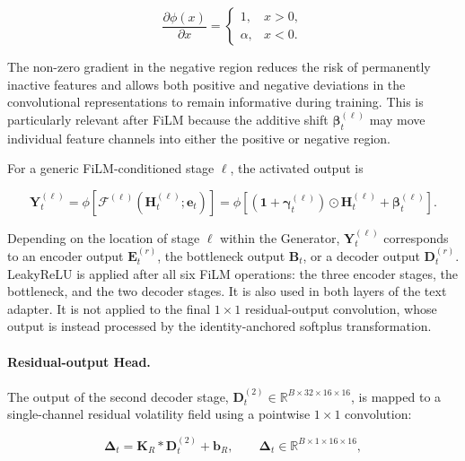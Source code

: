 \begin{equation}\label{eq:ch3:leaky_relu_derivative}
\frac{\partial\phi(x)}{\partial x}
=
\begin{cases}
1, & x>0,\\
\alpha, & x<0.
\end{cases}
\end{equation}

The non-zero gradient in the negative region reduces the risk of permanently
inactive features and allows both positive and negative deviations in the
convolutional representations to remain informative during training. This is
particularly relevant after FiLM because the additive shift
$\boldsymbol{\beta}^{(\ell)}_t$ may move individual feature channels into
either the positive or negative region.

For a generic FiLM-conditioned stage $\ell$, the activated output is

\begin{equation}\label{eq:ch3:film_leaky_relu_output}
\mathbf{Y}^{(\ell)}_t
=
\phi\left[
\mathcal{F}^{(\ell)}
\left(
\mathbf{H}^{(\ell)}_t;
\mathbf{e}_t
\right)
\right]
=
\phi\left[
\left(
\mathbf{1}
+
\boldsymbol{\gamma}^{(\ell)}_t
\right)
\odot
\mathbf{H}^{(\ell)}_t
+
\boldsymbol{\beta}^{(\ell)}_t
\right].
\end{equation}

Depending on the location of stage $\ell$ within the Generator,
$\mathbf{Y}^{(\ell)}_t$ corresponds to an encoder output
$\mathbf{E}^{(r)}_t$, the bottleneck output $\mathbf{B}_t$, or a decoder
output $\mathbf{D}^{(r)}_t$. LeakyReLU is applied after all six FiLM
operations: the three encoder stages, the bottleneck, and the two decoder
stages. It is also used in both layers of the text adapter. It is not applied
to the final $1\times1$ residual-output convolution, whose output is instead
processed by the identity-anchored softplus transformation.




\paragraph*{Residual-output Head.}
The output of the second decoder stage,
$\mathbf{D}^{(2)}_t\in\mathbb{R}^{B\times32\times16\times16}$, is mapped
to a single-channel residual volatility field using a pointwise
$1\times1$ convolution:

\begin{equation}\label{eq:ch3:residual_head}
\boldsymbol{\Delta}_t
=
\mathbf{K}_{R}
\ast
\mathbf{D}^{(2)}_t
+
\mathbf{b}_{R},
\qquad
\boldsymbol{\Delta}_t
\in
\mathbb{R}^{B\times1\times16\times16},
\end{equation}


